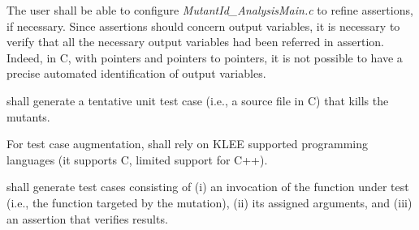 
\RQ{} The user shall be able to configure \emph{MutantId\_AnalysisMain.c} to refine assertions, if necessary.
\remark Since assertions should concern output variables, it is necessary to verify that all the necessary output variables had been referred in assertion. Indeed, in C, with pointers and pointers to pointers, it is not possible to have a precise automated identification of output variables.





\RQ{} \FAQAS shall generate a tentative unit test case (i.e., a source file in C) that kills the mutants.


\RQ{} For test case augmentation, \FAQAS shall rely on KLEE supported programming languages (it supports C, limited support for C++).

\RQ{} \FAQAS shall generate test cases consisting of (i) an invocation of the function under test (i.e., the function targeted by the mutation), (ii) its assigned arguments, and (iii) an assertion that verifies results.




